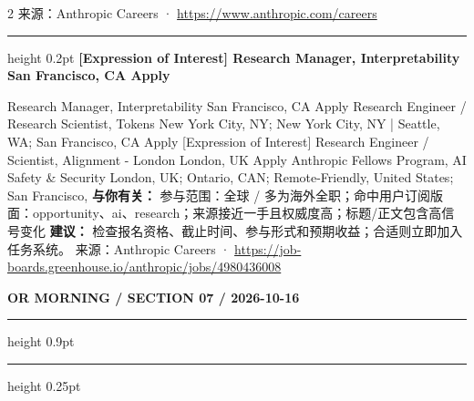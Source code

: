 \documentclass[10.5pt]{ctexart}
\begin{document}
\begin{multicols}{2}
{\footnotesize\color{ormuted} 来源：Anthropic Careers · \url{https://www.anthropic.com/careers}}
\vspace{2mm}
\hrule height 0.2pt
\vspace{2mm}
{\large\bfseries [Expression of Interest] Research Manager, Interpretability San Francisco, CA Apply}\par
[Expression of Interest] Research Manager, Interpretability San Francisco, CA Apply Research Engineer / Research Scientist, Tokens New York City, NY; New York City, NY | Seattle, WA; San Francisco, CA Apply [Expression of Interest] Research Engineer / Scientist, Alignment - London London, UK Apply Anthropic Fellows Program, AI Safety \& Security London, UK; Ontario, CAN; Remote-Friendly, United States; San Francisco, 
\textbf{与你有关：} 参与范围：全球 / 多为海外全职；命中用户订阅版面：opportunity、ai、research；来源接近一手且权威度高；标题/正文包含高信号变化
\textbf{建议：} 检查报名资格、截止时间、参与形式和预期收益；合适则立即加入任务系统。
{\footnotesize\color{ormuted} 来源：Anthropic Careers · \url{https://job-boards.greenhouse.io/anthropic/jobs/4980436008}}
\end{multicols}
\newpage
{\small\bfseries OR MORNING / SECTION 07 / 2026-10-16}
\vspace{2mm}
\hrule height 0.9pt
\vspace{1.5mm}
\hrule height 0.25pt
\vspace{4mm}
\end{document}
